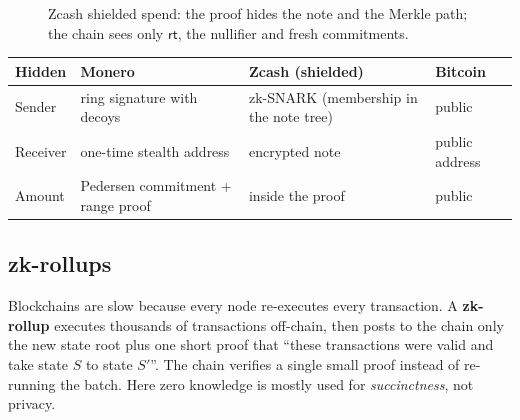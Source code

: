 \documentclass[11pt,a4paper]{article}
\newenvironment{plainenglish}{\par\smallskip}{\par\smallskip}
\theoremstyle{definition}
\theoremstyle{plain}
\theoremstyle{remark}
\begin{document}
\begin{figure}[htbp]
\centering
{}
\caption{Zcash shielded spend: the proof hides the note and the Merkle path; the chain sees only $\mathsf{rt}$, the nullifier and fresh commitments.}
\end{figure}

\begin{center}\small
\begin{tabular}{@{}llll@{}}
\toprule
\textbf{Hidden} & \textbf{Monero} & \textbf{Zcash (shielded)} & \textbf{Bitcoin}\\
\midrule
Sender & ring signature with decoys & zk-SNARK (membership in the note tree) & public\\
Receiver & one-time stealth address & encrypted note & public address\\
Amount & Pedersen commitment + range proof & inside the proof & public\\
\bottomrule
\end{tabular}
\end{center}

\subsection{zk-rollups}

\begin{plainenglish}
Blockchains are slow because every node re-executes every transaction. A \textbf{zk-rollup} executes thousands of transactions off-chain, then posts to the chain only the new state root plus one short proof that ``these transactions were valid and take state $S$ to state $S'$''. The chain verifies a single small proof instead of re-running the batch. Here zero knowledge is mostly used for \emph{succinctness}, not privacy.
\end{plainenglish}
\end{document}
